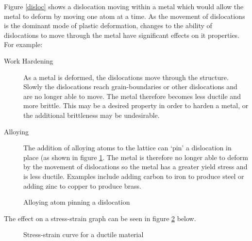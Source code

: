 \documentclass[a4paper,12pt]{book}
\newcounter{example}[chapter]
\begin{document}
Figure \ref{disloc} shows a dislocation moving within a metal which would allow the metal to deform by moving one atom at a time. As the movement of dislocations is the dominant mode of plastic deformation, changes to the ability of dislocations to move through the metal have significant effects on it properties. For example:
\begin{description}
    \item[Work Hardening] As a metal is deformed, the dislocations move through the structure. Slowly the dislocations reach grain-boundaries or other dislocations and are no longer able to move. The metal therefore becomes less ductile and more brittle. This may be a desired property in order to harden a metal, or the additional brittleness may be undesirable.
    \item[Alloying] The addition of alloying atoms to the lattice can `pin' a dislocation in place (as shown in figure \ref{alloying}. The metal is therefore no longer able to deform by the movement of dislocations so the metal has a greater yield stress and is less ductile. Examples include adding carbon to iron to produce steel or adding zinc to copper to produce brass.
\end{description}
\begin{figure}[h]\begin{center}
    \caption{Alloying atom pinning a dislocation}\label{alloying}
\end{center}\end{figure}

The effect on a stress-strain graph can be seen in figure \ref{stress-strain-alloy} below.

\begin{figure}[ht]
    \begin{center}
    \end{center}
    \caption{Stress-strain curve for a ductile material}
    \label{stress-strain-alloy}
\end{figure}
\end{document}
